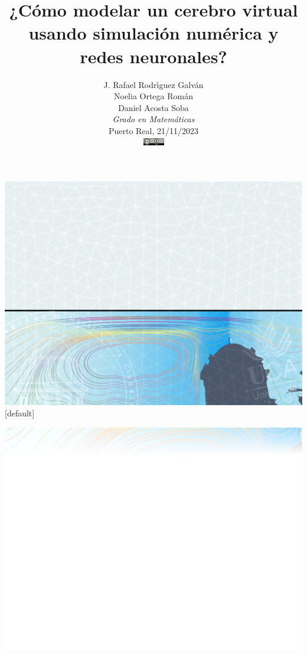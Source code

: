 \documentclass[
  unknownkeysallowed %
]{beamer}
\title[Cerebro virtual]
{¿Cómo modelar un cerebro virtual usando simulación numérica y redes neuronales?\vspace*{-0.5cm}}
\author[JRR, NOR, DAS]{%
  {J. Rafael Rodr\'{\i}guez Galv\'an\\
  Noelia Ortega Román\\
  Daniel Acosta Soba}
  \\[0.2em]
  {\small \em Grado en Matemáticas}
  \\[0.2em]
  {\scriptsize Puerto Real, 21/11/2023}
  \\[1em]
  \includegraphics[width=2.5em]{img/cc-by}
}
\date{}
\begin{document}

%
%
 {\includegraphics[width=\paperwidth,height=\paperheight]{frontpage_bg}}
[default]

\begin{frame}
  \titlepage
  \vspace{2.5cm}
\end{frame}

%
%

 {\includegraphics[width=\paperwidth,height=\paperheight]{slide_bg}}
\end{document}
